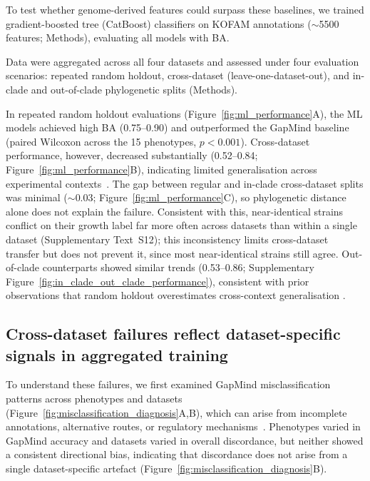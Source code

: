 To test whether genome-derived features could surpass these baselines, we trained gradient-boosted tree (CatBoost) classifiers on KOFAM annotations ($\sim$5500 features; Methods), evaluating all models with BA.

Data were aggregated across all four datasets and assessed under four evaluation scenarios: repeated random holdout, cross-dataset (leave-one-dataset-out), and in-clade and out-of-clade phylogenetic splits (Methods).

In repeated random holdout evaluations (Figure~\ref{fig:ml_performance}A), the ML models achieved high BA (0.75--0.90) and outperformed the GapMind baseline (paired Wilcoxon across the 15 phenotypes, $p < 0.001$).
Cross-dataset performance, however, decreased substantially (0.52--0.84; Figure~\ref{fig:ml_performance}B), indicating limited generalisation across experimental contexts~\cite{Pasolli2016MetaAnalysis}.
The gap between regular and in-clade cross-dataset splits was minimal ($\sim$0.03; Figure~\ref{fig:ml_performance}C), so phylogenetic distance alone does not explain the failure.
Consistent with this, near-identical strains conflict on their growth label far more often across datasets than within a single dataset (Supplementary Text~S12); this inconsistency limits cross-dataset transfer but does not prevent it, since most near-identical strains still agree.
Out-of-clade counterparts showed similar trends (0.53--0.86; Supplementary Figure~\ref{fig:in_clade_out_clade_performance}), consistent with prior observations that random holdout overestimates cross-context generalisation \cite{Roberts2017CrossValidation,Li2023-up}.


\FloatBarrier{}

\subsection*{Cross-dataset failures reflect dataset-specific signals in aggregated training}

To understand these failures, we first examined GapMind misclassification patterns across phenotypes and datasets (Figure~\ref{fig:misclassification_diagnosis}A,B), which can arise from incomplete annotations, alternative routes, or regulatory mechanisms~\cite{Price2020GapMind,Price2024Improving,Griesemer2018Combining,Pan2018Advances,Gorke2008CCR}.
Phenotypes varied in GapMind accuracy and datasets varied in overall discordance, but neither showed a consistent directional bias, indicating that discordance does not arise from a single dataset-specific artefact (Figure~\ref{fig:misclassification_diagnosis}B).

